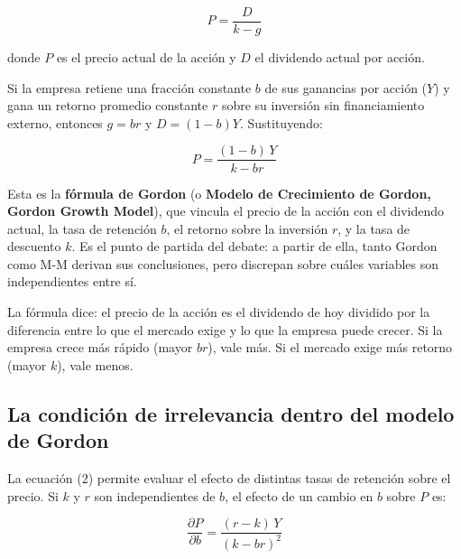 \documentclass[12pt]{article}
\begin{document}
\begin{equation}
P = \frac{D}{k - g}
\end{equation}

donde $P$ es el precio actual de la acci\'on y $D$ el dividendo actual por acci\'on.

Si la empresa retiene una fracci\'on constante $b$ de sus ganancias por acci\'on ($Y$) y gana un retorno promedio constante $r$ sobre su inversi\'on sin financiamiento externo, entonces $g = br$ y $D = (1-b)Y$. Sustituyendo:

\begin{equation}
P = \frac{(1-b)\,Y}{k - br}
\end{equation}

\begin{explicacion}
Esta es la \textbf{f\'ormula de Gordon} (o \textbf{Modelo de Crecimiento de Gordon, Gordon Growth Model}), que vincula el precio de la acci\'on con el dividendo actual, la tasa de retenci\'on $b$, el retorno sobre la inversi\'on $r$, y la tasa de descuento $k$. Es el punto de partida del debate: a partir de ella, tanto Gordon como M-M derivan sus conclusiones, pero discrepan sobre cu\'ales variables son independientes entre s\'i.
\end{explicacion}

\begin{intuicion}
La f\'ormula dice: el precio de la acci\'on es el dividendo de hoy dividido por la diferencia entre lo que el mercado exige y lo que la empresa puede crecer. Si la empresa crece m\'as r\'apido (mayor $br$), vale m\'as. Si el mercado exige m\'as retorno (mayor $k$), vale menos.
\end{intuicion}

\subsection{La condici\'on de irrelevancia dentro del modelo de Gordon}

La ecuaci\'on (2) permite evaluar el efecto de distintas tasas de retenci\'on sobre el precio. Si $k$ y $r$ son independientes de $b$, el efecto de un cambio en $b$ sobre $P$ es:

\begin{equation}
\frac{\partial P}{\partial b} = \frac{(r - k)\,Y}{(k - br)^2}
\end{equation}
\end{document}
